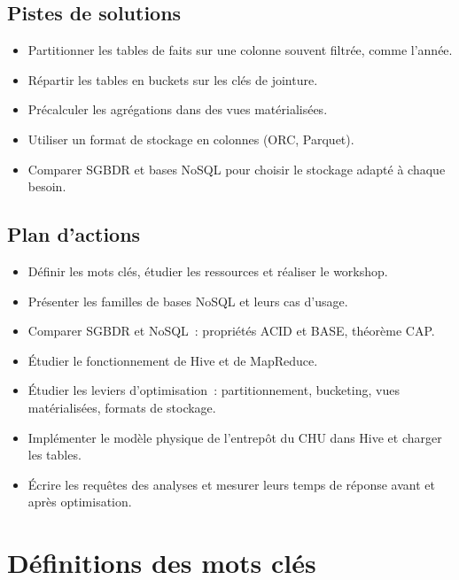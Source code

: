 \subsection*{Pistes de solutions}
{}
\begin{itemize}
	\item Partitionner les tables de faits sur une colonne souvent filtrée, comme l'année.
	\item Répartir les tables en buckets sur les clés de jointure.
	\item Précalculer les agrégations dans des vues matérialisées.
	\item Utiliser un format de stockage en colonnes (ORC, Parquet).
	\item Comparer SGBDR et bases NoSQL pour choisir le stockage adapté à chaque besoin.
\end{itemize}

\subsection*{Plan d'actions}
{}
\begin{itemize}
	\item Définir les mots clés, étudier les ressources et réaliser le workshop.
	\item Présenter les familles de bases NoSQL et leurs cas d'usage.
	\item Comparer SGBDR et NoSQL~: propriétés ACID et BASE, théorème CAP.
	\item Étudier le fonctionnement de Hive et de MapReduce.
	\item Étudier les leviers d'optimisation~: partitionnement, bucketing, vues matérialisées, formats de stockage.
	\item Implémenter le modèle physique de l'entrepôt du CHU dans Hive et charger les tables.
	\item Écrire les requêtes des analyses et mesurer leurs temps de réponse avant et après optimisation.
\end{itemize}


\newpage
\section{Définitions des mots clés}

